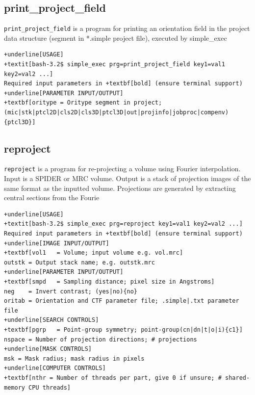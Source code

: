 \documentclass[a4paper,11pt]{article}
\newcommand{\prgname}[1]{\textcolor{NavyBlue}{\texttt{#1}}}
\begin{document}
\subsection{print\_project\_field}
\label{print_project_field}
\prgname{print\_project\_field} is a program for printing an orientation field in the project data structure (segment in *.simple project file), executed by simple\_exec
\begin{Verbatim}[commandchars=+\[\],fontsize=\small,breaklines=true]
+underline[USAGE]
+textit[bash-3.2$ simple_exec prg=print_project_field key1=val1 key2=val2 ...]
Required input parameters in +textbf[bold] (ensure terminal support)
+underline[PARAMETER INPUT/OUTPUT]
+textbf[oritype = Oritype segment in project; (mic|stk|ptcl2D|cls2D|cls3D|ptcl3D|out|projinfo|jobproc|compenv){ptcl3D}]
\end{Verbatim}

\subsection{reproject}
\label{reproject}
\prgname{reproject} is a program for re-projecting a volume using Fourier interpolation. Input is a SPIDER or MRC volume. Output is a stack of projection images of the same format as the inputted volume. Projections are generated by extracting central sections from the Fourie
\begin{Verbatim}[commandchars=+\[\],fontsize=\small,breaklines=true]
+underline[USAGE]
+textit[bash-3.2$ simple_exec prg=reproject key1=val1 key2=val2 ...]
Required input parameters in +textbf[bold] (ensure terminal support)
+underline[IMAGE INPUT/OUTPUT]
+textbf[vol1   = Volume; input volume e.g. vol.mrc]
outstk = Output stack name; e.g. outstk.mrc
+underline[PARAMETER INPUT/OUTPUT]
+textbf[smpd   = Sampling distance; pixel size in Angstroms]
neg    = Invert contrast; (yes|no){no}
oritab = Orientation and CTF parameter file; .simple|.txt parameter file
+underline[SEARCH CONTROLS]
+textbf[pgrp   = Point-group symmetry; point-group(cn|dn|t|o|i){c1}]
nspace = Number of projection directions; # projections
+underline[MASK CONTROLS]
msk = Mask radius; mask radius in pixels
+underline[COMPUTER CONTROLS]
+textbf[nthr = Number of threads per part, give 0 if unsure; # shared-memory CPU threads]
\end{Verbatim}
\end{document}
